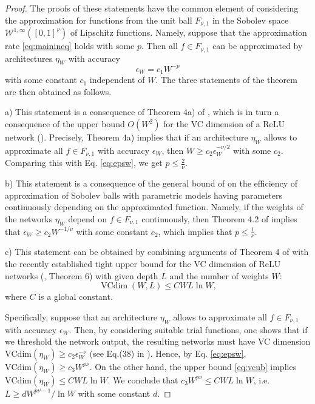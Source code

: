 \documentclass[final, 12pt]{colt2018}
\begin{document}
\begin{proof} 
The proofs of these statements have the common element of considering the approximation for functions from the unit ball $F_{\nu,1}$ in the  Sobolev space  $\mathcal W^{1,\infty}([0,1]^\nu)$  of Lipschitz functions. Namely, suppose that the approximation rate \eqref{eq:mainineq} holds with some $p$. Then all $f\in F_{\nu,1}$ can be approximated by architectures $\eta_W$ with accuracy \begin{equation}\label{eq:epsw}\epsilon_W= c_1 W^{-p}\end{equation} with some constant $c_1$ independent of $W$. The three statements of the theorem are then obtained as follows.

\medskip\noindent
a) This statement is a consequence of Theorem 4a) of \cite{yarotsky2017nn}, which is in turn a consequence of the upper bound $O(W^2)$ for the VC dimension of a ReLU network (\cite{goldberg1995bounding}). Precisely, Theorem 4a) implies that if an architecture $\eta_W$ allows to approximate all $f\in F_{\nu,1}$ with accuracy $\epsilon_W$, then $W\ge c_2\epsilon_W^{-\nu/2}$ with some $c_2$. Comparing this with Eq. \eqref{eq:epsw}, we get $p\le \frac{2}{\nu}.$

\medskip\noindent 
b) This statement is a consequence of the general bound of \cite{devore1989optimal} on the efficiency of approximation of Sobolev balls with parametric models having parameters continuously depending on the approximated function. Namely, if the weights of the networks $\eta_W$ depend on $f\in F_{\nu,1}$ continuously, then Theorem 4.2 of \cite{devore1989optimal} implies that $\epsilon_W\ge c_2 W^{-1/\nu} $ with some constant $c_2$, which implies that $p\le\frac{1}{\nu}.$

\medskip\noindent 
c) This statement can be obtained by combining arguments of Theorem 4 of \cite{yarotsky2017nn} with the recently established tight upper bound for the VC dimension of ReLU networks (\cite{bartlett2017nearly}, Theorem 6) with given depth $L$ and the number of weights $W$: \begin{equation}\label{eq:vcub}\operatorname{VCdim}(W,L)\le CWL\ln W,\end{equation} where $C$ is a global constant. 

Specifically, suppose that an architecture $\eta_W$ allows to approximate all $f\in F_{\nu,1}$ with accuracy $\epsilon_W$. Then, by considering suitable trial functions, one shows that if we threshold the network output, the resulting networks must have VC dimension $\mathrm{VCdim}(\eta_W)\ge c_2\epsilon_W^{-\nu}$ (see Eq.(38) in \cite{yarotsky2017nn}). Hence, by Eq. \eqref{eq:epsw}, $\mathrm{VCdim}(\eta_W)\ge c_3 W^{p\nu}$. On the other hand,  the upper bound \eqref{eq:vcub} implies $\mathrm{VCdim}(\eta_W)\le CWL\ln W$. We conclude that $c_3W^{p\nu}\le CWL\ln W$, i.e. $L\ge dW^{p\nu-1}/\ln W$ with some constant $d$. 
\end{proof}
\end{document}
